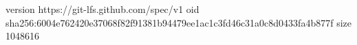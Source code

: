 version https://git-lfs.github.com/spec/v1
oid sha256:6004e762420e37068f82f91381b94479ee1ac1c3fd46c31a0c8d0433fa4b877f
size 1048616
